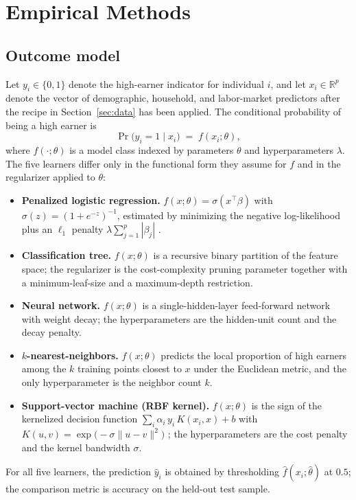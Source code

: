 \documentclass[12pt,english]{article}
\begin{document}
\section{Empirical Methods}\label{sec:methods}

\subsection{Outcome model}

Let $y_i \in \{0,1\}$ denote the high-earner indicator for individual $i$,
and let $x_i \in \mathbb{R}^{p}$ denote the vector of demographic, household,
and labor-market predictors after the recipe in Section~\ref{sec:data} has
been applied. The conditional probability of being a high earner is
\begin{equation}
\label{eq:1}
\Pr\bigl(y_i = 1 \mid x_i\bigr) \;=\; f\!\left(x_i;\theta\right),
\end{equation}
where $f(\cdot;\theta)$ is a model class indexed by parameters $\theta$ and
hyperparameters $\lambda$. The five learners differ only in the functional
form they assume for $f$ and in the regularizer applied to $\theta$:
\begin{itemize}
\item \textbf{Penalized logistic regression.} $f(x;\theta) =
\sigma\!\left(x^{\top}\beta\right)$ with $\sigma(z) = (1+e^{-z})^{-1}$,
estimated by minimizing the negative log-likelihood plus an
$\ell_1$ penalty $\lambda \sum_{j=1}^{p}|\beta_j|$
\citep{tibshirani1996}.
\item \textbf{Classification tree.} $f(x;\theta)$ is a recursive
binary partition of the feature space; the regularizer is the
cost-complexity pruning parameter together with a minimum-leaf-size and a
maximum-depth restriction.
\item \textbf{Neural network.} $f(x;\theta)$ is a single-hidden-layer
feed-forward network with weight decay; the hyperparameters are the
hidden-unit count and the decay penalty.
\item \textbf{$k$-nearest-neighbors.} $f(x;\theta)$ predicts the local
proportion of high earners among the $k$ training points closest to $x$
under the Euclidean metric, and the only hyperparameter is the neighbor
count $k$.
\item \textbf{Support-vector machine (RBF kernel).} $f(x;\theta)$ is the
sign of the kernelized decision function $\sum_{i} \alpha_i \, y_i \,
K(x_i, x) + b$ with $K(u,v) = \exp\!\bigl(-\sigma\|u-v\|^2\bigr)$
\citep{cortes1995}; the hyperparameters are the cost penalty and the
kernel bandwidth $\sigma$.
\end{itemize}
For all five learners, the prediction $\hat{y}_i$ is obtained by
thresholding $\hat{f}(x_i;\hat{\theta})$ at $0.5$; the comparison metric
is accuracy on the held-out test sample.
\end{document}
